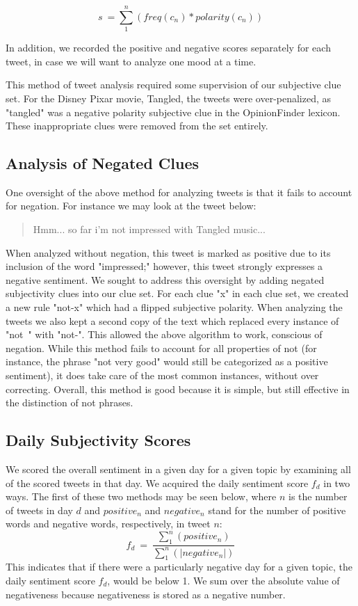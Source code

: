 \documentclass[11pt]{article}
\begin{document}
\begin{equation}
s\ = \sum_{1}^{n}(freq(c_{n})*polarity(c_{n}))
\end{equation}

In addition, we recorded the positive and negative scores separately for each tweet, in case we will want to analyze one mood at a time.

This method of tweet analysis required some supervision of our subjective clue set. For the Disney Pixar movie, Tangled, the tweets were over-penalized, as "tangled" was a negative polarity subjective clue in the OpinionFinder lexicon. These inappropriate clues were removed from the set entirely.

\subsection{Analysis of Negated Clues}
One oversight of the above method for analyzing tweets is that it fails to account for negation. For instance we may look at the tweet below:

\begin{quote}
Hmm... so far i'm not impressed with Tangled music...
\end{quote}

When analyzed without negation, this tweet is marked as positive due to its inclusion of the word "impressed;" however, this tweet strongly expresses a negative sentiment. We sought to address this oversight by adding negated subjectivity clues into our clue set. For each clue "x" in each clue set, we created a new rule "not-x" which had a flipped subjective polarity. When analyzing the tweets we also kept a second copy of the text which replaced every instance of "not\ " with "not-". This allowed the above algorithm to work, conscious of negation. While this method fails to account for all properties of not (for instance, the phrase "not very good" would still be categorized as a positive sentiment), it does take care of the most common instances, without over correcting.  Overall, this method is good because it is simple, but still effective in the distinction of not phrases.

\subsection{Daily Subjectivity Scores}
We scored the overall sentiment in a given day for a given topic by examining all of the scored tweets in that day. We acquired the daily sentiment score $f_{d}$ in two ways. The first of these two methods may be seen below, where $n$ is the number of tweets in day $d$ and $positive_{n}$ and $negative_{n}$ stand for the number of positive words and negative words, respectively, in tweet $n$:
\begin{equation}
f_{d}\ =\ \frac{\sum_{1}^{n}(positive_{n})}{\sum_{1}^{n}(|negative_{n}|)}
\end{equation}
This indicates that if there were a particularly negative day for a given topic, the daily sentiment score $f_{d}$, would be below 1. We sum over the absolute value of negativeness because negativeness is stored as a negative number.
\end{document}
